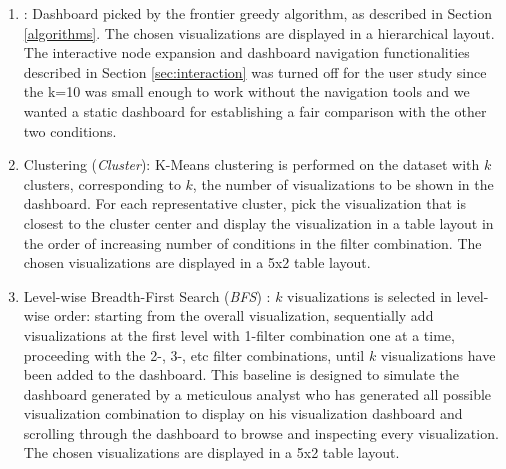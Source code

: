 \begin{enumerate}
	\item \system: Dashboard picked by the frontier greedy algorithm, as described in Section \ref{algorithms}. The chosen visualizations are displayed in a hierarchical layout. The interactive node expansion and dashboard navigation functionalities described in Section \ref{sec:interaction} was turned off for the user study since the k=10 was small enough to work without the navigation tools and we wanted a static dashboard for establishing a fair comparison with the other two conditions.
	\item Clustering (\textit{Cluster}): K-Means clustering is performed on the dataset with $k$ clusters, corresponding to $k$, the number of visualizations to be shown in the dashboard. For each representative cluster, pick the visualization that is closest to the cluster center and display the visualization in a table layout in the order of increasing number of conditions in the filter combination. The chosen visualizations are displayed in a 5x2 table layout.
	\item Level-wise Breadth-First Search (\textit{BFS}) : $k$ visualizations is selected in level-wise order: starting from the overall visualization, sequentially add visualizations at the first level with 1-filter combination one at a time, proceeding with the 2-, 3-, etc filter combinations, until $k$ visualizations have been added to the dashboard. This baseline is designed to simulate the dashboard generated by a meticulous analyst who has generated all possible visualization combination to display on his visualization dashboard and scrolling through the dashboard to browse and inspecting every visualization. The chosen visualizations are displayed in a 5x2 table layout.

\end{enumerate}
